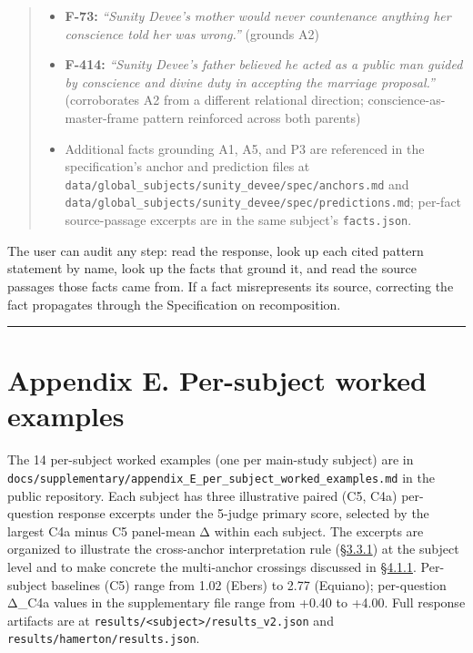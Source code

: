 \begin{quote}
\begin{itemize}
\tightlist
\item
  \textbf{F-73:} \emph{``Sunity Devee's mother would never countenance
  anything her conscience told her was wrong.''} (grounds A2)
\item
  \textbf{F-414:} \emph{``Sunity Devee's father believed he acted as a
  public man guided by conscience and divine duty in accepting the
  marriage proposal.''} (corroborates A2 from a different relational
  direction; conscience-as-master-frame pattern reinforced across both
  parents)
\item
  Additional facts grounding A1, A5, and P3 are referenced in the
  specification's anchor and prediction files at
  \texttt{data/global\_subjects/sunity\_devee/spec/anchors.md} and
  \texttt{data/global\_subjects/sunity\_devee/spec/predictions.md};
  per-fact source-passage excerpts are in the same subject's
  \texttt{facts.json}.
\end{itemize}
\end{quote}

The user can audit any step: read the response, look up each cited
pattern statement by name, look up the facts that ground it, and read
the source passages those facts came from. If a fact misrepresents its
source, correcting the fact propagates through the Specification on
recomposition.

\begin{center}\rule{0.5\linewidth}{0.5pt}\end{center}

\hypertarget{appendix-e.-per-subject-worked-examples}{%
\section{Appendix E. Per-subject worked
examples}\label{appendix-e.-per-subject-worked-examples}}

The 14 per-subject worked examples (one per main-study subject) are in
\texttt{docs/supplementary/appendix\_E\_per\_subject\_worked\_examples.md}
in the public repository. Each subject has three illustrative paired
(C5, C4a) per-question response excerpts under the 5-judge primary
score, selected by the largest C4a minus C5 panel-mean Δ within each
subject. The excerpts are organized to illustrate the cross-anchor
interpretation rule (\hyperref[score-interpretation]{§3.3.1}) at the subject level and to make concrete
the multi-anchor crossings discussed in \hyperref[per-question-baseline-engagement-and-the-worked-rubric-example]{§4.1.1}. Per-subject baselines
(C5) range from 1.02 (Ebers) to 2.77 (Equiano); per-question Δ\_C4a
values in the supplementary file range from +0.40 to +4.00. Full
response artifacts are at
\texttt{results/\textless{}subject\textgreater{}/results\_v2.json} and
\texttt{results/hamerton/results.json}.

